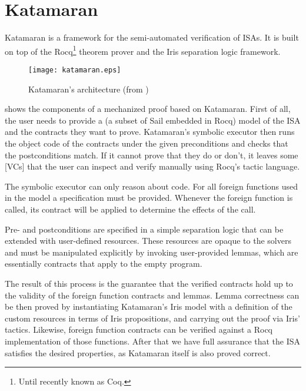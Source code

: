 \section{Katamaran}

Katamaran \cite{Huyghebaert2023} is a framework for the semi-automated verification of ISAs. It is built on top of the Rocq\footnote{Until recently known as Coq.} theorem prover and the Iris separation logic framework.

\begin{figure}[htb]
  \centering
  \texttt{[image: katamaran.eps]}
  \caption{Katamaran's architecture (from \cite{Huyghebaert2023})}
  \label{fig:katamaran}
\end{figure}

 shows the components of a mechanized proof based on Katamaran. First of all, the user needs to provide a \usail (a subset of Sail embedded in Rocq) model of the ISA and the contracts they want to prove. Katamaran's symbolic executor then runs the object code of the contracts under the given preconditions and checks that the postconditions match. If it cannot prove that they do or don't, it leaves some [VCs] that the user can inspect and verify manually using Rocq's tactic language.

The symbolic executor can only reason about \usail code. For all foreign functions used in the model a specification must be provided. Whenever the foreign function is called, its contract will be applied to determine the effects of the call.

Pre- and postconditions are specified in a simple separation logic that can be extended with user-defined resources. These resources are opaque to the solvers and must be manipulated explicitly by invoking user-provided lemmas, which are essentially contracts that apply to the empty program.

The result of this process is the guarantee that the verified contracts hold up to the validity of the foreign function contracts and lemmas. Lemma correctness can be then proved by instantiating Katamaran's Iris model with a definition of the custom resources in terms of Iris propositions, and carrying out the proof via Iris' tactics. Likewise, foreign function contracts can be verified against a Rocq implementation of those functions. After that we have full assurance that the ISA satisfies the desired properties, as Katamaran itself is also proved correct.

